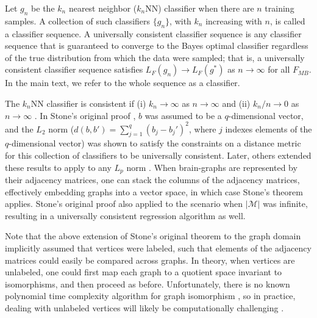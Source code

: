 \documentclass{article}
\newcommand{\conv}{\rightarrow}
\providecommand{\mc}[1]{\mathcal{#1}}
\begin{document}
Let $g_n$ be the $k_n$ nearest neighbor ($k_n$NN) classifier when there are $n$ training samples.  
A collection of such classifiers $\{g_n\}$,  with $k_n$ increasing with $n$, is called a classifier sequence.  
A universally consistent classifier sequence is any classifier sequence that is guaranteed to converge to the Bayes optimal classifier regardless of the true distribution from which the data were sampled; that is, a universally consistent classifier sequence satisfies $L_F(g_n) \conv L_F(g^*)$ as $n \conv \infty$ for all $F_{MB}$. In the main text, we refer to the whole sequence as a classifier.

The $k_n$NN classifier is consistent if (i) $k_n \conv \infty$ as $n \conv \infty$ and (ii) $k_n/n \conv 0$ as $n\conv\infty$ \cite{Stone1977}. In Stone's original proof \cite{Stone1977}, $b$ was assumed to be a $q$-dimensional vector, and the $L_2$ norm ($d(b,b')=\sum_{j=1}^q (b_j-b_j')^2$, where $j$ indexes elements of the $q$-dimensional vector) was shown to satisfy the constraints on a distance metric for this collection of classifiers to be universally consistent.  Later, others extended these results to apply to any $L_p$ norm \cite{DGL96}.  When brain-graphs are represented by their adjacency matrices, one can stack the columns of the adjacency matrices, effectively embedding graphs into a vector space, in which case Stone's theorem applies.  Stone's original proof also applied to the scenario when $|\mc{M}|$ was infinite, resulting in a universally consistent regression algorithm as well.

Note that the above extension of Stone's original theorem to the graph domain implicitly assumed that vertices were labeled, such that elements of the adjacency matrices could easily be compared across graphs.  In theory, when vertices are unlabeled, one could first map each graph to a quotient space invariant to isomorphisms, and then proceed as before.  Unfortunately, 
there is no known polynomial time complexity algorithm for graph isomorphism
\cite{GareyJohnson79}, so in practice, dealing with unlabeled vertices will likely be computationally challenging \cite{VP11_unlabeled}.



\end{document}
